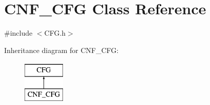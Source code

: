 \hypertarget{classCNF__CFG}{\section{C\-N\-F\-\_\-\-C\-F\-G Class Reference}
\label{classCNF__CFG}
}


{\ttfamily \#include $<$C\-F\-G.\-h$>$}

Inheritance diagram for C\-N\-F\-\_\-\-C\-F\-G\-:\begin{figure}[H]
\begin{center}
\leavevmode
\includegraphics[height=2.000000cm]{da/d5c/classCNF__CFG}
\end{center}
\end{figure}
